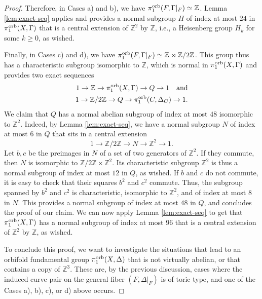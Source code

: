 \documentclass{amsart}
\newcommand{\zz}{\mathbb{Z}}
\theoremstyle{definition}
\theoremstyle{remark}
\numberwithin{equation}{section}
\begin{document}
\begin{proof}
\medskip

Therefore, in Cases a) and b), we have $\pi_1^{\rm orb}(F,\Gamma|_F)\simeq \zz$. Lemma \ref{lem:exact-seq} applies and provides a normal subgroup $H$ of index at most $24$ in $\pi_1^{\rm orb}(X,\Gamma)$ that is a central extension of $\zz^2$ by $\zz$, i.e., a Heisenberg group $H_k$ for some $k\ge 0$, as wished.

\medskip

Finally, in Cases c) and d), we have $\pi_1^{\rm orb}(F,\Gamma|_F)\simeq \zz\rtimes\zz/2\zz$. This group thus has a characteristic subgroup isomorphic to $\zz$, which is normal in $\pi_1^{\rm orb}(X,\Gamma)$ and provides two exact sequences
\begin{gather}
    \begin{aligned}
     1\to \zz\to \pi_1^{\rm orb}(X,\Gamma)\to Q\to 1 \quad \mbox{and}\\
     1\to \zz/2\zz \to Q \to \pi_1^{\rm orb}(C,\Delta_C)\to 1.
    \end{aligned}
\end{gather}
We claim that $Q$ has a normal abelian subgroup of index at most $48$ isomorphic to $\zz^2$.
Indeed, by Lemma \ref{lem:exact-seq}, we have a normal subgroup $N$ of index at most $6$ in $Q$ that sits in a central extension
$$1\to \zz/2\zz\to N\to \zz^2\to 1.$$
Let $b,c$ be the preimages in $N$ of a set of two generators of $\zz^2$. If they commute, then $N$ is isomorphic to $\zz/2\zz\times \zz^2$. Its characteristic subgroup $\zz^2$ is thus a normal subgroup of index at most $12$ in $Q$, as wished. If $b$ and $c$ do not commute, it is easy to check that their squares $b^2$ and $c^2$ commute. Thus, the subgroup spanned by $b^2$ and $c^2$ is characteristic, isomorphic to $\zz^2$, and of index at most $8$ in $N$. This provides a normal subgroup of index at most $48$ in $Q$, and concludes the proof of our claim. 
We can now apply Lemma \ref{lem:exact-seq} to get that $\pi_1^{\rm orb}(X,\Gamma)$ has a normal subgroup of index at most $96$ that is a central extension of $\zz^2$ by $\zz$, as wished.

\medskip

To conclude this proof, we want to investigate the situations that lead to an orbifold fundamental group $\pi_1^{\rm orb}(X,\Delta)$ that is not virtually abelian, or that contains a copy of $\zz^3$. These are, by the previous discussion, cases where the induced curve pair on the general fiber $(F,\Delta|_F)$ is of toric type, and one of the Cases a), b), c), or d) above occurs. 


\end{proof}
\end{document}
